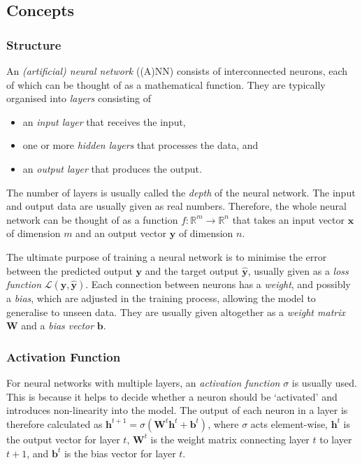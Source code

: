 \documentclass[a4paper,11pt,titlepage]{article}
\theoremstyle{definition}
\theoremstyle{plain}
\theoremstyle{remark}
\begin{document}
\subsection{Concepts}

\subsubsection{Structure}

An \textit{(artificial) neural network} ((A)NN) consists of interconnected neurons, each of which can be thought of as a mathematical function. They are typically organised into \textit{layers} consisting of

\begin{itemize}
    \item an \textit{input layer} that receives the input,
    \item one or more \textit{hidden layers} that processes the data, and
    \item an \textit{output layer} that produces the output.
\end{itemize}

The number of layers is usually called the \textit{depth} of the neural network. The input and output data are usually given as real numbers. Therefore, the whole neural network can be thought of as a function $f:\mathbb{R}^m\rightarrow\mathbb{R}^n$ that takes an input vector $\mathbf{x}$ of dimension $m$ and an output vector $\mathbf{y}$ of dimension $n$.

The ultimate purpose of training a neural network is to minimise the error between the predicted output $\mathbf{y}$ and the target output $\mathbf{\hat{y}}$, usually given as a \textit{loss function} $\mathcal{L}(\mathbf{y}, \mathbf{\hat{y}})$. Each connection between neurons has a \textit{weight}, and possibly a \textit{bias}, which are adjusted in the training process, allowing the model to generalise to unseen data. They are usually given altogether as a \textit{weight matrix} $\mathbf{W}$ and a \textit{bias vector} $\mathbf{b}$.

\subsubsection{Activation Function}

For neural networks with multiple layers, an \textit{activation function} $\sigma$ is usually used. This is because it helps to decide whether a neuron should be ‘activated’ and introduces non-linearity into the model. The output of each neuron in a layer is therefore calculated as $\mathbf{h}^{t+1}=\sigma\left(\mathbf{W}^t\mathbf{h}^t+\mathbf{b}^t\right)$, where $\sigma$ acts element-wise, $\mathbf{h}^t$ is the output vector for layer $t$, $\mathbf{W}^t$ is the weight matrix connecting layer $t$ to layer $t+1$, and $\mathbf{b}^t$ is the bias vector for layer $t$. 
\end{document}
